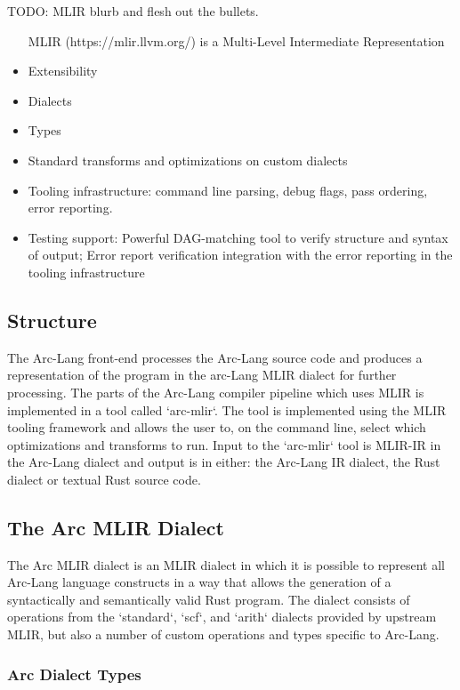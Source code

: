 TODO: MLIR blurb and flesh out the bullets.

\begin{itemize}
  \item [MLIR](https://mlir.llvm.org/) is a Multi-Level Intermediate Representation
  \item Extensibility
  \item Dialects
  \item Types
  \item Standard transforms and optimizations on custom dialects
  \item Tooling infrastructure: command line parsing, debug flags, pass ordering, error reporting.
  \item Testing support: Powerful DAG-matching tool to verify structure and syntax of output; Error report verification integration with the error reporting in the tooling infrastructure
\end{itemize}

\subsection{Structure}

The Arc-Lang front-end processes the Arc-Lang source code and produces a representation of the program in the arc-Lang MLIR dialect for further processing. The parts of the Arc-Lang compiler pipeline which uses MLIR is implemented in a tool called `arc-mlir`. The tool is implemented using the MLIR tooling framework and allows the user to, on the command line, select which optimizations and transforms to run. Input to the `arc-mlir` tool is MLIR-IR in the Arc-Lang dialect and output is in either: the Arc-Lang IR dialect, the Rust dialect or textual Rust source code.

\subsection{The Arc MLIR Dialect}

The Arc MLIR dialect is an MLIR dialect in which it is possible to represent all Arc-Lang language constructs in a way that allows the generation of a syntactically and semantically valid Rust program. The dialect consists of operations from the `standard`, `scf`, and `arith` dialects provided by upstream MLIR, but also a number of custom operations and types specific to Arc-Lang.

\subsubsection{Arc Dialect Types}


